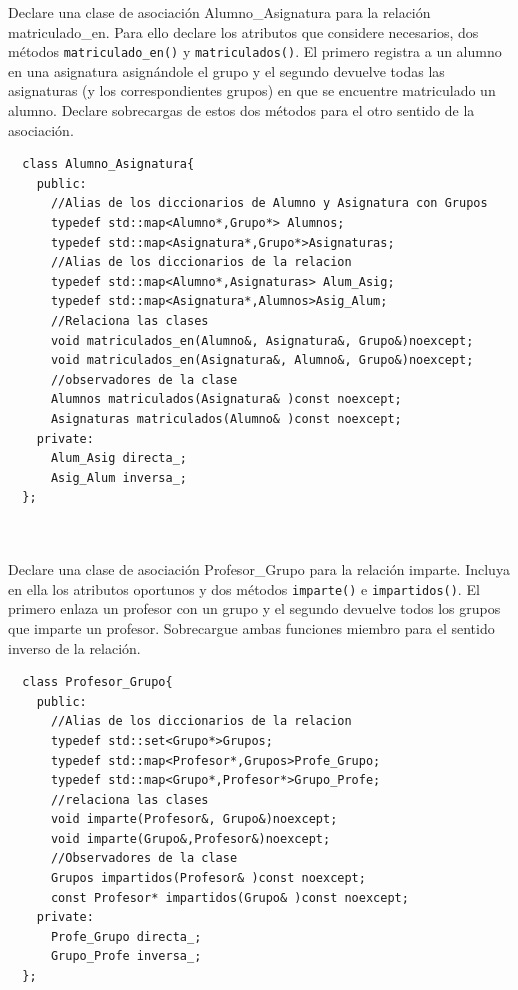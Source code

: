  Declare una clase de asociación Alumno\_Asignatura para la relación matriculado\_en. Para ello declare los atributos que considere necesarios, dos métodos \texttt{matriculado\_en()} y \texttt{matriculados()}. El primero registra a un alumno en una asignatura asignándole el grupo y el segundo devuelve todas las asignaturas (y los correspondientes grupos) en que se encuentre matriculado un alumno. Declare sobrecargas de estos dos métodos para el otro sentido de la asociación.
\begin{verbatim}
  class Alumno_Asignatura{
    public:
      //Alias de los diccionarios de Alumno y Asignatura con Grupos
      typedef std::map<Alumno*,Grupo*> Alumnos;
      typedef std::map<Asignatura*,Grupo*>Asignaturas;
      //Alias de los diccionarios de la relacion
      typedef std::map<Alumno*,Asignaturas> Alum_Asig;
      typedef std::map<Asignatura*,Alumnos>Asig_Alum;
      //Relaciona las clases
      void matriculados_en(Alumno&, Asignatura&, Grupo&)noexcept;
      void matriculados_en(Asignatura&, Alumno&, Grupo&)noexcept;
      //observadores de la clase
      Alumnos matriculados(Asignatura& )const noexcept;
      Asignaturas matriculados(Alumno& )const noexcept;
    private:
      Alum_Asig directa_;
      Asig_Alum inversa_;
  };



\end{verbatim}

Declare una clase de asociación Profesor\_Grupo para la relación imparte. Incluya en ella los atributos oportunos y dos métodos \texttt{imparte()} e \texttt{impartidos()}. El primero enlaza un profesor con un grupo y el segundo devuelve todos los grupos que imparte un profesor. Sobrecargue ambas funciones miembro para el sentido inverso de la relación.
\begin{verbatim}
  class Profesor_Grupo{
    public:
      //Alias de los diccionarios de la relacion
      typedef std::set<Grupo*>Grupos;
      typedef std::map<Profesor*,Grupos>Profe_Grupo;
      typedef std::map<Grupo*,Profesor*>Grupo_Profe;
      //relaciona las clases
      void imparte(Profesor&, Grupo&)noexcept;
      void imparte(Grupo&,Profesor&)noexcept;
      //Observadores de la clase
      Grupos impartidos(Profesor& )const noexcept;
      const Profesor* impartidos(Grupo& )const noexcept;
    private:
      Profe_Grupo directa_;
      Grupo_Profe inversa_;
  };
\end{verbatim}

